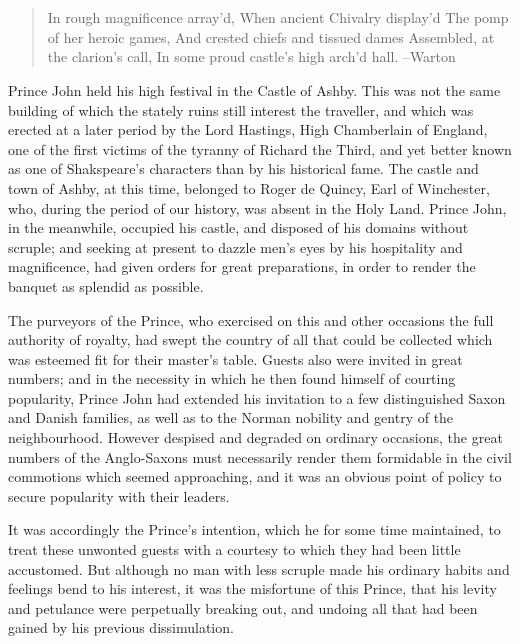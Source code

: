 \chapter{}

\begin{quote}
In rough magnificence array'd,
When ancient Chivalry display'd
The pomp of her heroic games,
And crested chiefs and tissued dames
Assembled, at the clarion's call,
In some proud castle's high arch'd hall.
--Warton
\end{quote}

Prince John held his high festival in the Castle of Ashby. This was not
the same building of which the stately ruins still interest the
traveller, and which was erected at a later period by the Lord Hastings,
High Chamberlain of England, one of the first victims of the tyranny of
Richard the Third, and yet better known as one of Shakspeare's
characters than by his historical fame. The castle and town of Ashby, at
this time, belonged to Roger de Quincy, Earl of Winchester, who, during
the period of our history, was absent in the Holy Land. Prince John, in
the meanwhile, occupied his castle, and disposed of his domains without
scruple; and seeking at present to dazzle men's eyes by his hospitality
and magnificence, had given orders for great preparations, in order to
render the banquet as splendid as possible.

The purveyors of the Prince, who exercised on this and other occasions
the full authority of royalty, had swept the country of all that could
be collected which was esteemed fit for their master's table. Guests
also were invited in great numbers; and in the necessity in which he
then found himself of courting popularity, Prince John had extended his
invitation to a few distinguished Saxon and Danish families, as well as
to the Norman nobility and gentry of the neighbourhood. However despised
and degraded on ordinary occasions, the great numbers of the
Anglo-Saxons must necessarily render them formidable in the civil
commotions which seemed approaching, and it was an obvious point of
policy to secure popularity with their leaders.

It was accordingly the Prince's intention, which he for some time
maintained, to treat these unwonted guests with a courtesy to which they
had been little accustomed. But although no man with less scruple made
his ordinary habits and feelings bend to his interest, it was the
misfortune of this Prince, that his levity and petulance were
perpetually breaking out, and undoing all that had been gained by his
previous dissimulation.

